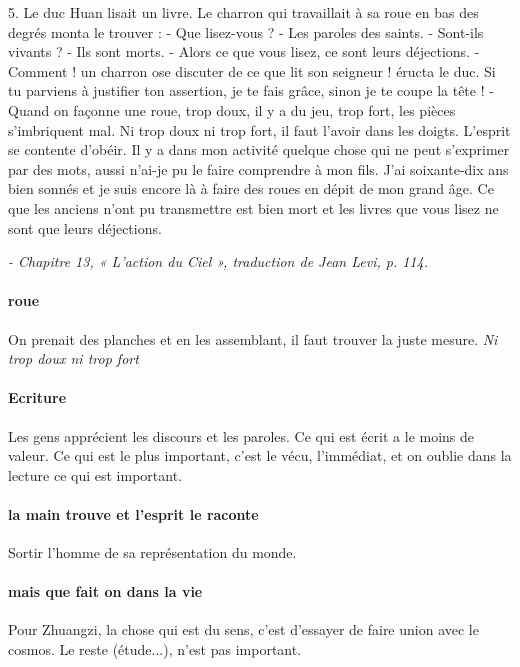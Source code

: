    
  \begin{singlequote}
      5. Le duc Huan lisait un livre. Le charron qui travaillait à sa roue en bas des degrés monta le trouver : - Que lisez-vous ? - Les paroles des saints. - Sont-ils vivants ? - Ils sont morts.   - Alors ce que vous lisez, ce sont leurs déjections. - Comment ! un charron ose discuter de ce que lit son seigneur ! éructa le duc. Si tu parviens à justifier ton assertion, je te fais grâce, sinon je te coupe la tête ! - Quand on façonne une roue, trop doux, il y a du jeu, trop fort, les pièces s’imbriquent mal. Ni trop doux ni trop fort, il faut l’avoir dans les doigts. L’esprit se contente d’obéir. Il y a dans mon activité quelque chose qui ne peut s’exprimer par des mots, aussi n’ai-je pu le faire comprendre à mon fils. J’ai soixante-dix ans bien sonnés et je suis encore là à faire des roues en dépit de mon grand âge. Ce que les anciens n’ont pu transmettre est bien mort et les livres que vous lisez ne sont que leurs déjections.   
      
      \textit{\small - Chapitre 13, « L’action du Ciel », traduction de Jean Levi, p. 114.  }
  \end{singlequote}


  \paragraph{roue} On prenait des planches et en les assemblant, il faut trouver la juste mesure. \textit{Ni trop doux ni trop fort}

\paragraph{Ecriture}
  Les gens apprécient les discours et les paroles. Ce qui est écrit a le moins de valeur. Ce qui est le plus important, c'est le vécu, l'immédiat, et on oublie dans la lecture ce qui est important.

  \paragraph{la main trouve et l'esprit le raconte} Sortir l'homme de sa représentation du monde.

  \paragraph{mais que fait on dans la vie} Pour Zhuangzi, la chose qui est du sens, c'est d'essayer de faire union avec le cosmos. Le reste (étude...), n'est pas important. 



